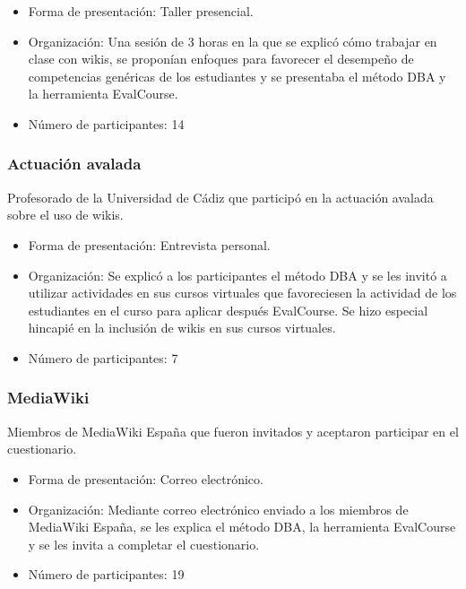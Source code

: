 	\begin{itemize}
		\item{Forma de presentación:} Taller presencial.

		\item{Organización:} Una sesión de 3 horas en la que se explicó cómo trabajar en clase con wikis, se proponían enfoques para favorecer el desempeño de competencias genéricas de los estudiantes y se presentaba el método DBA y la herramienta EvalCourse.

		\item{Número de participantes:} 14
	\end{itemize}

\subsubsection{Actuación avalada}
Profesorado de la Universidad de Cádiz que participó en la actuación avalada sobre el uso de wikis.

	\begin{itemize}
		\item{Forma de presentación:} Entrevista personal.

		\item{Organización:} Se explicó a los participantes el método DBA y se les invitó a utilizar actividades en sus cursos virtuales que favoreciesen la actividad de los estudiantes en el curso para aplicar después EvalCourse. Se hizo especial hincapié en la inclusión de wikis en sus cursos virtuales. 

		\item{Número de participantes:} 7
	\end{itemize}

\subsubsection{MediaWiki}
Miembros de MediaWiki España que fueron invitados y aceptaron participar en el cuestionario.

	\begin{itemize}
		\item{Forma de presentación:} Correo electrónico.

		\item{Organización:} Mediante correo electrónico enviado a los miembros de MediaWiki España, se les explica el método DBA, la herramienta EvalCourse y se les invita a completar el cuestionario.

		\item{Número de participantes:} 19 %
	\end{itemize}

